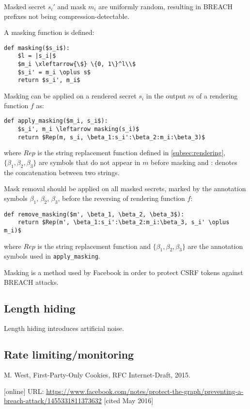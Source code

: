 \documentclass[a4paper, 11 pt, conference]{article}
\begin{document}
Masked secret $s_i'$ and mask $m_i$ are uniformly random, resulting in BREACH
prefixes not being compression-detectable.

A masking function is defined:

\begin{lstlisting}[texcl,mathescape]
def masking($s_i$):
    $l = |s_i|$
    $m_i \xleftarrow{\$} \{0, 1\}^l\\$
    $s_i' = m_i \oplus s$
    return $s_i', m_i$
\end{lstlisting}

Masking can be applied on a rendered secret $s_i$ in the output $m$ of a
rendering function $f$ as:

\begin{lstlisting}[texcl,mathescape]
def apply_masking($m_i, s_i$):
    $s_i', m_i \leftarrow masking(s_i)$
    return $Rep(m, s_i, \beta_1:s_i':\beta_2:m_i:\beta_3)$
\end{lstlisting}

where $Rep$ is the string replacement function defined in
\ref{subsec:rendering}, $\{\beta_1, \beta_2, \beta_3\}$ are symbols that do not
appear in $m$ before masking and : denotes the concatenation between two
strings.

Mask removal should be applied on all masked secrets, marked by the annotation
symbols $\beta_1$, $\beta_2$, $\beta_3$, before the reversing of rendering function $f$:

\begin{lstlisting}[texcl,mathescape]
def remove_masking($m', \beta_1, \beta_2, \beta_3$):
    return $Rep(m', \beta_1:s_i':\beta_2:m_i:\beta_3, s_i' \oplus m_i)$
\end{lstlisting}

where $Rep$ is the string replacement function and $\{\beta_1, \beta_2,
\beta_3\}$ are the annotation symbols used in \texttt{apply\_masking}.

Masking is a method used by Facebook \cite{c2} in order to protect CSRF tokens
against BREACH attacks.

\subsection{Length hiding}\label{subsec:noise}
Length hiding introduces artificial noise.

\subsection{Rate limiting/monitoring}\label{subsec:monitoring}

\begin{thebibliography}{2}

 M. West, First-Party-Only Cookies, RFC Internet-Draft, 2015.

 [online] URL:
\url{https://www.facebook.com/notes/protect-the-graph/preventing-a-breach-attack/1455331811373632}
[cited May 2016]

\end{thebibliography}
\end{document}
